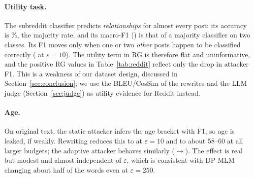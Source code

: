 \documentclass[11pt]{article}
\begin{document}
\begin{table}[t]
\centering
\small

\caption{Results on the constructed Reddit dataset (macro-F1 \%, $n_{\text{test}}=\NTest$). Lower attacker F1 means better privacy. ``Pronouns only'': logistic regression on counts of eight third-person pronouns (\emph{he, him, his, himself, she, her, hers, herself}) trained on original text. The utility task is degenerate (always predicts the majority subreddit), so RG here reflects only the privacy term; see text.}
\label{tab:reddit}
\end{table}

\paragraph{Utility task.} The subreddit classifier predicts \emph{relationships} for almost every post: its accuracy is \SubAccOrig\%, the majority rate, and its macro-F1 (\FSubSOrig) is that of a majority classifier on two classes. Its F1 moves only when one or two \emph{other} posts happen to be classified correctly (\FSubSTen{} at $\varepsilon=10$). The utility term in RG is therefore flat and uninformative, and the positive RG values in Table~\ref{tab:reddit} reflect only the drop in attacker F1. This is a weakness of our dataset design, discussed in Section~\ref{sec:conclusion}; we use the BLEU/CosSim of the rewrites and the LLM judge (Section~\ref{sec:judge}) as utility evidence for Reddit instead.

\paragraph{Age.} On original text, the static attacker infers the age bracket with \FAgeSOrig{} F1, so age is leaked, if weakly. Rewriting reduces this to \FAgeSTen{} at $\varepsilon=10$ and to about 58--60 at all larger budgets; the adaptive attacker behaves similarly (\FAgeAOrig$\rightarrow$\FAgeATen). The effect is real but modest and almost independent of $\varepsilon$, which is consistent with DP-MLM changing about half of the words even at $\varepsilon=250$.
\end{document}
